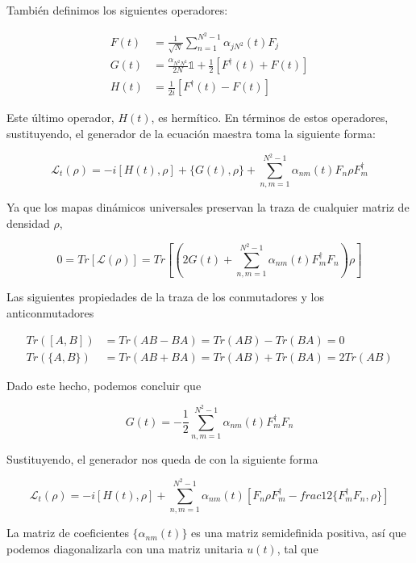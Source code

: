 También definimos los siguientes operadores:

\begin{align}
    F(t) &= \frac{1}{\sqrt{N}} \sum_{n=1}^{N^2-1} \alpha_{jN^2}(t) F_j \\
    G(t) &= \frac{\alpha_{N^2N^2}}{2N} \mathds{1} + \frac{1}{2} [F^\dagger(t) + F(t)] \\
    H(t) &= \frac{1}{2i} [F^\dagger(t) - F(t)]
\end{align}

Este último operador, $H(t)$, es hermítico. En términos de estos operadores, sustituyendo, el generador de la ecuación maestra toma la siguiente forma:

\begin{equation}
    \mathcal{L}_t(\rho) = -i [H(t), \rho] + \{G(t), \rho\} + \sum_{n,m=1}^{N^2-1} \alpha_{nm}(t) F_n \rho F_m^\dagger
\end{equation}

Ya que los mapas dinámicos universales preservan la traza de cualquier matriz de densidad $\rho$,

\begin{equation}
    0 = Tr[\mathcal{L}(\rho)] = Tr\left[ \left(2G(t) + \sum_{n,m=1}^{N^2-1} \alpha_{nm}(t) F_m^\dagger F_n \right) \rho \right]
\end{equation}

Las siguientes propiedades de la traza de los conmutadores y los anticonmutadores

\begin{align}
    Tr([A,B]) &= Tr(AB - BA) = Tr(AB) - Tr(BA) = 0 \\
    Tr(\{A,B\}) &= Tr(AB + BA) = Tr(AB) + Tr(BA) = 2 Tr(AB)
\end{align}

Dado este hecho, podemos concluir que 

\begin{equation}
    G(t) = - \frac{1}{2} \sum_{n,m=1}^{N^2-1} \alpha_{nm}(t) F_m^\dagger F_n
\end{equation}

Sustituyendo, el generador nos queda de con la siguiente forma

\begin{equation}
    \mathcal{L}_t(\rho) = -i [H(t), \rho] + \sum_{n,m=1}^{N^2-1} \alpha_{nm}(t) \left[F_n \rho F_m^\dagger - frac{1}{2} \{F_m^\dagger F_n, \rho\}\right]
\end{equation}

La matriz de coeficientes $\{\alpha_{nm}(t)\}$ es una matriz semidefinida positiva, así que podemos diagonalizarla con una matriz unitaria $u(t)$, tal que

